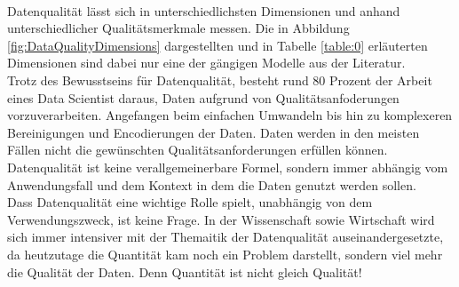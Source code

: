 \begin{onehalfspace}
\begin{table}[h]
            \caption{Data Quality Dimensions Merkmale}
            \label{table:0}
        \end{table}
        \\
        Datenqualität lässt sich in unterschiedlichsten Dimensionen und anhand unterschiedlicher Qualitätsmerkmale messen. Die in Abbildung \ref*{fig:DataQualityDimensions} dargestellten und in Tabelle \ref*{table:0} erläuterten Dimensionen sind dabei nur eine der gängigen Modelle aus der Literatur. 
        \\
        Trotz des Bewusstseins für Datenqualität, besteht rund 80 Prozent der Arbeit eines Data Scientist daraus, Daten aufgrund von Qualitätsanfoderungen vorzuverarbeiten.\cite{Horn2022} Angefangen beim einfachen Umwandeln bis hin zu komplexeren Bereinigungen und Encodierungen der Daten. Daten werden in den meisten Fällen nicht die gewünschten Qualitätsanforderungen erfüllen können. Datenqualität ist keine verallgemeinerbare Formel, sondern immer abhängig vom Anwendungsfall und dem Kontext in dem die Daten genutzt werden sollen.
        \\
        Dass Datenqualität eine wichtige Rolle spielt, unabhängig von dem Verwendungszweck, ist keine Frage. In der Wissenschaft sowie Wirtschaft wird sich immer intensiver mit der Themaitik der Datenqualität auseinandergesetzte, da heutzutage die Quantität kam noch ein Problem darstellt, sondern viel mehr die Qualität der Daten.\cite{Lis2019} Denn Quantität ist nicht gleich Qualität!



\end{onehalfspace}
